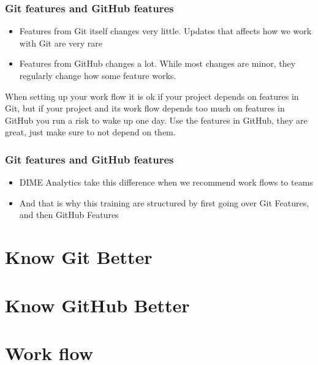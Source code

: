 \documentclass[aspectratio=169]{beamer} %
\begin{document}
\begin{frame}
	\frametitle{Git features and GitHub features}
		
	\begin{itemize}
		\item Features from Git itself changes very little. Updates that affects how we work with Git are very rare
		\item Features from GitHub changes a lot. While most changes are minor, they regularly change how some feature works. 
	\end{itemize}  
	
	When setting up your work flow it is ok if your project depends on features in Git, but if your project and its work flow depends too much on features in GitHub you run a risk to wake up one day.	Use the features in GitHub, they are great, just make sure to not depend on them.

\end{frame}

\begin{frame}
	\frametitle{Git features and GitHub features}
	
	\begin{itemize}
		\item DIME Analytics take this difference when we recommend work flows to teams
		\item And that is why this training are structured by first going over Git Features, and then GitHub Features
	\end{itemize}  
\end{frame}

\section{Know Git Better}

\section{Know GitHub Better}

\section{Work flow}
\end{document}
